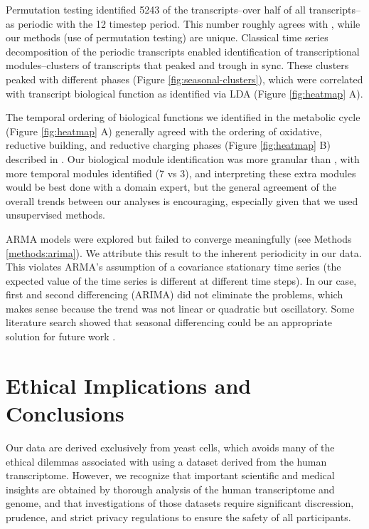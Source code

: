 \documentclass[11pt]{amsart}
\begin{document}
Permutation testing identified 5243 of the transcripts--over half of all transcripts--as periodic with the 12 timestep period. This number roughly agrees with \cite{Tu2005}, while our methods (use of permutation testing) are unique. Classical time series decomposition of the periodic transcripts enabled identification of transcriptional modules--clusters of transcripts that peaked and trough in sync. These clusters peaked with different phases (Figure \ref{fig:seasonal-clusters}), which were correlated with transcript biological function as identified via LDA (Figure \ref{fig:heatmap} A).

The temporal ordering of biological functions we identified in the metabolic cycle (Figure \ref{fig:heatmap} A) generally agreed with the ordering of oxidative, reductive building, and reductive charging phases (Figure \ref{fig:heatmap} B) described in \cite{Tu2005}. Our biological module identification was more granular than \cite{Tu2005}, with more temporal modules identified (7 vs 3), and interpreting these extra modules would be best done with a domain expert, but the general agreement of the overall trends between our analyses is encouraging, especially given that we used unsupervised methods.

ARMA models were explored but failed to converge meaningfully (see Methods \ref{methods:arima}). We attribute this result to the inherent periodicity in our data. This violates ARMA's assumption of a covariance stationary time series (the expected value of the time series is different at different time steps). In our case, first and second differencing (ARIMA) did not eliminate the problems, which makes sense because the trend was not linear or quadratic but oscillatory. Some literature search showed that seasonal differencing could be an appropriate solution for future work \cite{rob_j_hyndman_forecasting_2026}.


\section{Ethical Implications and Conclusions}
Our data are derived exclusively from yeast cells, which avoids many of the ethical dilemmas associated with using a dataset derived from the human transcriptome. However, we recognize that important scientific and medical insights are obtained by thorough analysis of the human transcriptome and genome, and that investigations of those datasets require significant discression, prudence, and strict privacy regulations to ensure the safety of all participants. 
\end{document}
